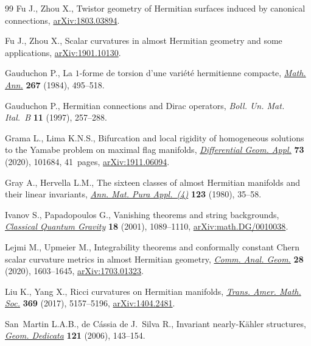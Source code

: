 \documentclass[10pt,a4paper]{amsart}
\numberwithin{equation}{section}
\begin{document}
\begin{thebibliography}{99}
Fu J., Zhou X., Twistor geometry of Hermitian surfaces induced by canonical
 connections, \href{https://arxiv.org/abs/1803.03894}{arXiv:1803.03894}.

Fu J., Zhou X., Scalar curvatures in almost Hermitian geometry and some
 applications, \href{https://arxiv.org/abs/1901.10130}{arXiv:1901.10130}.

Gauduchon P., La {$1$}-forme de torsion d'une vari\'et\'e hermitienne compacte,
 \href{https://doi.org/10.1007/BF01455968}{\textit{Math. Ann.}} \textbf{267} (1984), 495--518.

Gauduchon P., Hermitian connections and {D}irac operators, \textit{Boll. Un.
 Mat. Ital.~B} \textbf{11} (1997), 257--288.

Grama L., Lima K.N.S., Bifurcation and local rigidity of homogeneous solutions
 to the {Y}amabe problem on maximal flag manifolds, \href{https://doi.org/10.1016/j.difgeo.2020.101684}{\textit{Differential Geom.
 Appl.}} \textbf{73} (2020), 101684, 41~pages, \href{https://arxiv.org/abs/1911.06094}{arXiv:1911.06094}.

Gray A., Hervella L.M., The sixteen classes of almost {H}ermitian manifolds and
 their linear invariants, \href{https://doi.org/10.1007/BF01796539}{\textit{Ann. Mat. Pura Appl.~(4)}} \textbf{123}
 (1980), 35--58.

Ivanov S., Papadopoulos G., Vanishing theorems and string backgrounds,
 \href{https://doi.org/10.1088/0264-9381/18/6/309}{\textit{Classical Quantum Gravity}} \textbf{18} (2001), 1089--1110,
 \href{https://arxiv.org/abs/math.DG/0010038}{arXiv:math.DG/0010038}.

Lejmi M., Upmeier M., Integrability theorems and conformally constant {C}hern
 scalar curvature metrics in almost {H}ermitian geometry, \href{https://doi.org/10.4310/CAG.2020.v28.n7.a4}{\textit{Comm. Anal.
 Geom.}} \textbf{28} (2020), 1603--1645, \href{https://arxiv.org/abs/1703.01323}{arXiv:1703.01323}.

Liu K., Yang X., Ricci curvatures on {H}ermitian manifolds, \href{https://doi.org/10.1090/tran/7000}{\textit{Trans.
 Amer. Math. Soc.}} \textbf{369} (2017), 5157--5196, \href{https://arxiv.org/abs/1404.2481}{arXiv:1404.2481}.

San~Martin L.A.B., de C\'assia de J.~Silva R., Invariant nearly-{K}\"ahler structures,
 \href{https://doi.org/10.1007/s10711-006-9095-7}{\textit{Geom. Dedicata}} \textbf{121} (2006), 143--154.


\end{thebibliography}
\end{document}
